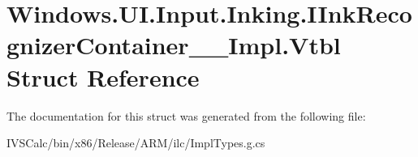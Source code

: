 \hypertarget{struct_windows_1_1_u_i_1_1_input_1_1_inking_1_1_i_ink_recognizer_container_____impl_1_1_vtbl}{}\section{Windows.\+U\+I.\+Input.\+Inking.\+I\+Ink\+Recognizer\+Container\+\_\+\+\_\+\+Impl.\+Vtbl Struct Reference}
\label{struct_windows_1_1_u_i_1_1_input_1_1_inking_1_1_i_ink_recognizer_container_____impl_1_1_vtbl}


The documentation for this struct was generated from the following file\+:\begin{DoxyCompactItemize}
\item 
I\+V\+S\+Calc/bin/x86/\+Release/\+A\+R\+M/ilc/Impl\+Types.\+g.\+cs\end{DoxyCompactItemize}

